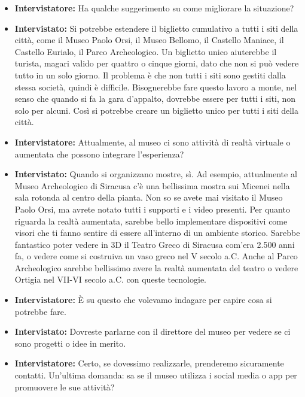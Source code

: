 \documentclass{article}
\begin{document}
\begin{itemize}
    \item \textbf{Intervistatore:} Ha qualche suggerimento su come migliorare la situazione?
    
    \item \textbf{Intervistato:} Si potrebbe estendere il biglietto cumulativo a tutti i siti della città, come il Museo Paolo Orsi, il Museo Bellomo, il Castello Maniace, il Castello Eurialo, il Parco Archeologico. Un biglietto unico aiuterebbe il turista, magari valido per quattro o cinque giorni, dato che non si può vedere tutto in un solo giorno. Il problema è che non tutti i siti sono gestiti dalla stessa società, quindi è difficile. Bisognerebbe fare questo lavoro a monte, nel senso che quando si fa la gara d’appalto, dovrebbe essere per tutti i siti, non solo per alcuni. Così si potrebbe creare un biglietto unico per tutti i siti della città.
    
    \item \textbf{Intervistatore:} Attualmente, al museo ci sono attività di realtà virtuale o aumentata che possono integrare l’esperienza?
    
    \item \textbf{Intervistato:} Quando si organizzano mostre, sì. Ad esempio, attualmente al Museo Archeologico di Siracusa c’è una bellissima mostra sui Micenei nella sala rotonda al centro della pianta. Non so se avete mai visitato il Museo Paolo Orsi, ma avrete notato tutti i supporti e i video presenti. Per quanto riguarda la realtà aumentata, sarebbe bello implementare dispositivi come visori che ti fanno sentire di essere all’interno di un ambiente storico. Sarebbe fantastico poter vedere in 3D il Teatro Greco di Siracusa com’era 2.500 anni fa, o vedere come si costruiva un vaso greco nel V secolo a.C. Anche al Parco Archeologico sarebbe bellissimo avere la realtà aumentata del teatro o vedere Ortigia nel VII-VI secolo a.C. con queste tecnologie.
    
    \item \textbf{Intervistatore:} È su questo che volevamo indagare per capire cosa si potrebbe fare.
    
    \item \textbf{Intervistato:} Dovreste parlarne con il direttore del museo per vedere se ci sono progetti o idee in merito.
    
    \item \textbf{Intervistatore:} Certo, se dovessimo realizzarle, prenderemo sicuramente contatti. Un’ultima domanda: sa se il museo utilizza i social media o app per promuovere le sue attività?
    

\end{itemize}
\end{document}
